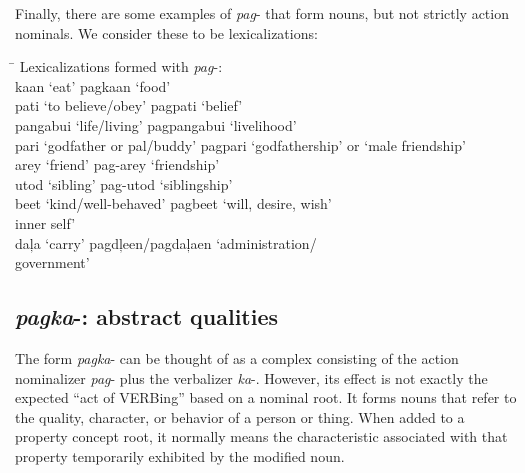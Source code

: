 Finally, there are some examples of \textit{pag}{}- that form nouns, but not strictly action nominals. We consider these to be lexicalizations:

\ea
\begin{tabbing}
\hspace{5cm} \= \kill
Lexicalizations formed with \textit{pag}{}-: \\
kaan ‘eat’ \> pagkaan ‘food’ \\
pati ‘to believe/obey’ \> pagpati ‘belief’ \\
pangabui ‘life/living’ \> pagpangabui ‘livelihood’ \\
pari ‘godfather or pal/buddy’ \> pagpari ‘godfathership’ or ‘male friendship’ \\
arey ‘friend'  \>  pag{}-arey ‘friendship’ \\
utod ‘sibling’ \> pag{}-utod ‘siblingship’ \\
beet ‘kind/well-behaved' \> pagbeet ‘will, desire, wish’ \\
inner self’ \\
daļa ‘carry’  \>  pagdļeen/pagdaļaen ‘administration/ \\
  \> government’
\end{tabbing}
\z
\subsection{\textit{pagka}-: abstract qualities}
\label{sec:pagka}

The form \textit{pagka}{}- can be thought of as a complex consisting of the action nominalizer \textit{pag}{}- plus the verbalizer \textit{ka}{}-. However, its effect is not exactly the expected “act of VERBing” based on a nominal root. It forms nouns that refer to the quality, character, or behavior of a person or thing. When added to a property concept root, it normally means the characteristic associated with that property temporarily exhibited by the modified noun.

